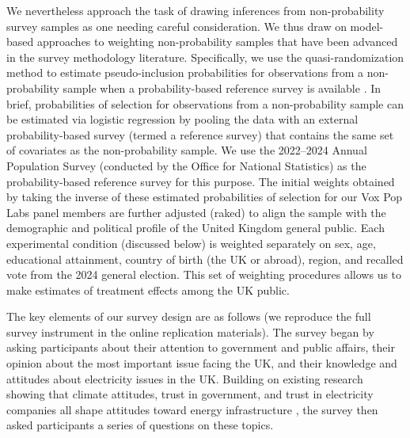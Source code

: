 \documentclass[a4paper, 11pt]{article}
\begin{document}
We nevertheless approach the task of drawing inferences from non-probability survey samples as one needing careful consideration. We thus draw on model-based approaches to weighting non-probability samples that have been advanced in the survey methodology literature. Specifically, we use the quasi-randomization method to estimate pseudo-inclusion probabilities for observations from a non-probability sample when a probability-based reference survey is available \citep{elliott2009,elliott_valliant2017,lee2009}. In brief, probabilities of selection for observations from a non-probability sample can be estimated via logistic regression by pooling the data with an external probability-based survey (termed a reference survey) that contains the same set of covariates as the non-probability sample. We use the 2022--2024 Annual Population Survey (conducted by the Office for National Statistics) as the probability-based reference survey for this purpose. The initial weights obtained by taking the inverse of these estimated probabilities of selection for our Vox Pop Labs panel members are further adjusted (raked) to align the sample with the demographic and political profile of the United Kingdom general public. Each experimental condition (discussed below) is weighted separately on sex, age, educational attainment, country of birth (the UK or abroad), region, and recalled vote from the 2024 general election. This set of weighting procedures allows us to make estimates of treatment effects among the UK public.

The key elements of our survey design are as follows (we reproduce the full survey instrument in the online replication materials). The survey began by asking participants about their attention to government and public affairs, their opinion about the most important issue facing the UK, and their knowledge and attitudes about electricity issues in the UK. Building on existing research showing that climate attitudes, trust in government, and trust in electricity companies all shape attitudes toward energy infrastructure \citep{aina_poy2026,konisky2020}, the survey then asked participants a series of questions on these topics.
\end{document}
